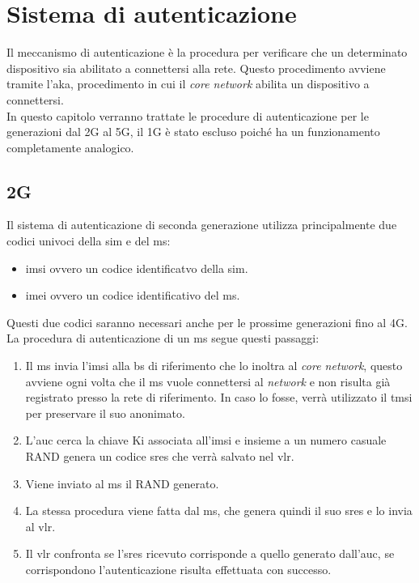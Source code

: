 \chapter{Sistema di autenticazione}
Il meccanismo di autenticazione è la procedura per verificare che un determinato dispositivo
sia abilitato a connettersi alla rete.
Questo procedimento avviene tramite l'\gls{aka}, procedimento in cui
il \textit{core network} abilita un dispositivo a connettersi.\\
In questo capitolo verranno trattate le procedure di autenticazione\cite{identifications} per le generazioni dal 2G al 5G, il 1G è stato escluso 
poiché ha un funzionamento completamente analogico.

\clearpage

\section{2G}
Il sistema di autenticazione di seconda generazione utilizza principalmente due codici univoci della \gls{sim} e del \gls{ms}:
\begin{itemize}
    \item \gls{imsi} ovvero un codice identificatvo della \gls{sim}.
    \item \gls{imei} ovvero un codice identificativo del \gls{ms}.
\end{itemize}
Questi due codici saranno necessari anche per le prossime generazioni fino al 4G.\\
La procedura di autenticazione di un \gls{ms} segue questi passaggi:
\begin{enumerate}
    \item Il \gls{ms} invia l'\gls{imsi} alla \gls{bs} di riferimento che lo inoltra al \textit{core network}, questo
    avviene ogni volta che il \gls{ms} vuole connettersi al \textit{network} e non risulta già registrato presso 
    la rete di riferimento. In caso lo fosse, verrà utilizzato il \gls{tmsi}
    per preservare il suo anonimato.
    \item L'\gls{auc} cerca la chiave Ki associata all'\gls{imsi} e insieme a un numero casuale RAND genera un codice \gls{sres} che verrà
    salvato nel \gls{vlr}.
    \item Viene inviato al \gls{ms} il RAND generato.
    \item La stessa procedura viene fatta dal \gls{ms}, che genera quindi il suo \gls{sres} e lo invia al \gls{vlr}.
    \item Il \gls{vlr} confronta se l'\gls{sres} ricevuto corrisponde a quello generato dall'\gls{auc}, se corrispondono l'autenticazione risulta
    effettuata con successo.
\end{enumerate}

